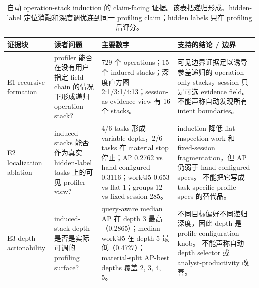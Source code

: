 \begin{table}[t]
  \centering
  \small
  \caption{自动 operation-stack induction 的 claim-facing 证据。该表把递归形成、hidden-label 定位消融和深度调优连到同一 profiling claim；hidden labels 只在 profiling 后评分。}
  \label{tab:induction-display}
  \begin{tabular}{p{}p{}p{}p{}}
    \toprule
    证据块 & 读者问题 & 主要数字 & 支持的结论 / 边界 \\
    \midrule
    E1 recursive formation & profiler 能否在没有用户指定 field chain 的情况下形成递归 operation stack? & 729 个 operations；15 个 induced stacks；深度直方图 2:1/3:1/4:13；session-as-evidence view 有 16 个 stacks。 & 可见边界证据足以诱导参差递归的 operation-only stacks，session 只是可选 evidence field。 不能声称自动发现所有 intent boundaries。 \\
    E2 localization ablation & induced stacks 能否作为真实 hidden-label tasks 上的可见 profiler view? & 4/6 tasks 形成 variable depth，2/6 tasks 在 material stop 停止；AP 0.2762 vs hand-configured 0.3116；work@5 0.653 vs flat 1；groups 12 vs fixed-session 285。 & induction 降低 flat inspection work 和 fixed-session fragmentation，但 AP 仍弱于 hand-configured specs。 不能把它写成 task-specific profile specs 的替代品。 \\
    E3 depth actionability & induced-stack depth 是否是实际可调的 profiling surface? & query-aware median AP 在 depth 3 最高（0.2865）；median work@5 在 depth 5 最低（0.4727）；material-split AP-best depths 覆盖 2, 3, 4, 5。 & 不同目标偏好不同递归深度，因此 depth 是 profile-configuration knob。 不能声称自动 depth selector 或 analyst-productivity 改善。 \\
    \bottomrule
  \end{tabular}
\end{table}

